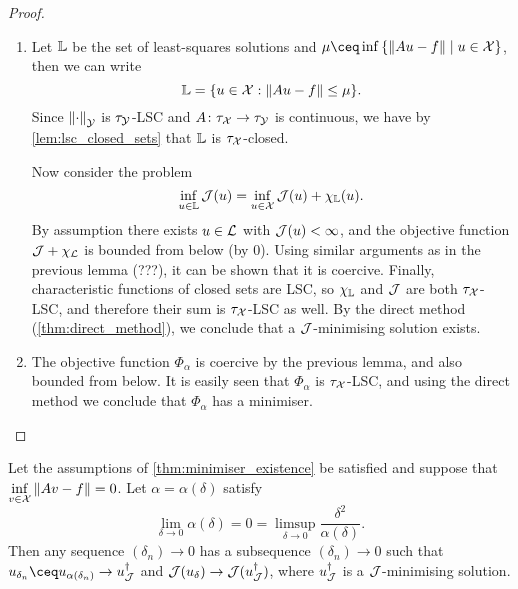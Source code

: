 \begin{proof}
	\begin{enumerate}
		\item Let $\mathbb L$ be the set of least-squares solutions and $\mu \ceq \inf\qty{\norm{Au - f} \mid u \in \XX}$, then we can write
		\[
		\mathbb L = \qty{u \in \mathcal X: \norm{Au - f} \leq \mu}. 
		\]
		Since $\norm{\cdot}_\mathcal Y$ is $\tau_\mathcal Y$-LSC and $A \colon \tau_\mathcal X \to \tau_\mathcal Y$ is continuous, we have by \cref{lem:lsc_closed_sets} that $\mathbb L$ is $\tau_\mathcal X$-closed.
		
		Now consider the problem 
		\[
		\inf_{u \in \mathbb L} \mathcal J(u) = \inf_{u \in \mathcal X} \mathcal J(u) + \chi_\mathbb L(u). 
		\] 
		By assumption there exists $u \in \mathcal L$ with $\mathcal J(u) < \infty$, and the objective function $\mathcal J + \chi_\mathcal L$ is bounded from below (by 0). Using similar arguments as in the previous lemma (???), it can be shown that it is coercive. Finally, characteristic functions of closed sets are LSC, so $\chi_\mathbb L$ and $\mathcal J$ are both $\tau_\mathcal X$-LSC, and therefore their sum is $\tau_\mathcal X$-LSC as well. By the direct method (\cref{thm:direct_method}), we conclude that a $\mathcal J$-minimising solution exists. 
		
		\item The objective function $\Phi_\alpha$ is coercive by the previous lemma, and also bounded from below. It is easily seen that $\Phi_\alpha$ is $\tau_\mathcal X$-LSC, and using the direct method we conclude that $\Phi_\alpha$ has a minimiser. 
	\end{enumerate}
\end{proof}

\begin{theorem} \label{thm:minimiser_convergence}
	Let the assumptions of \cref{thm:minimiser_existence} be satisfied and suppose that $\inf\limits_{v \in \mathcal X} \norm{Av - f} = 0$. 
	Let $\alpha = \alpha(\delta)$ satisfy \[
	\lim_{\delta\to0} \alpha(\delta) = 0  = \limsup_{\delta \to 0} \frac{\delta^2}{\alpha(\delta)}. 
	\]
	Then any sequence $(\delta_n) \to 0$ has a subsequence $(\delta_n) \to 0$ such that $u_{\delta_n} \ceq u_{\alpha(\delta_n)} \to u_\JJ \D$ and $\mathcal J(u_\delta) \to \mathcal J(u_\mathcal J^\dagger)$, where $u_\mathcal J^\dagger$ is a $\mathcal J$-minimising solution. 
\end{theorem}


